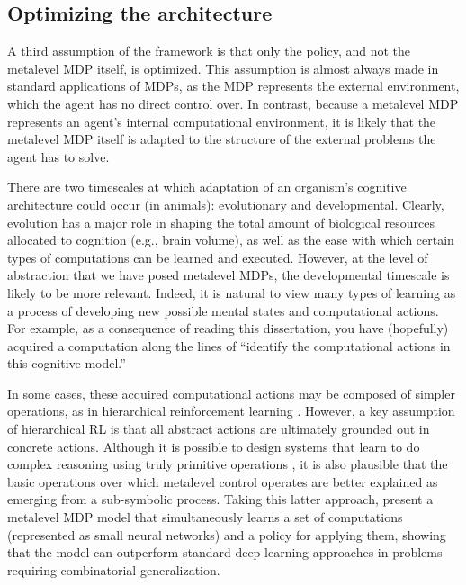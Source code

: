 \subsection{Optimizing the architecture}\label{sec:optimize-architecture}

A third assumption of the framework is that only the policy, and not the metalevel MDP itself, is optimized. This assumption is almost always made in standard applications of MDPs, as the MDP represents the external environment, which the agent has no direct control over. In contrast, because a metalevel MDP represents an agent's internal computational environment, it is likely that the metalevel MDP itself is adapted to the structure of the external problems the agent has to solve.

There are two timescales at which adaptation of an organism's cognitive architecture could occur (in animals): evolutionary and developmental. Clearly, evolution has a major role in shaping the total amount of biological resources allocated to cognition (e.g., brain volume), as well as the ease with which certain types of computations can be learned and executed. However, at the level of abstraction that we have posed metalevel MDPs, the developmental timescale is likely to be more relevant. Indeed, it is natural to view many types of learning as a process of developing new possible mental states and computational actions. For example, as a consequence of reading this dissertation, you have (hopefully) acquired a computation along the lines of ``identify the computational actions in this cognitive model.''

In some cases, these acquired computational actions may be composed of simpler operations, as in hierarchical reinforcement learning \citep{sutton1999mdps,dietterich2000hierarchical,bacon2016optioncritic}. However, a key assumption of hierarchical RL is that all abstract actions are ultimately grounded out in concrete actions. Although it is possible to design systems that learn to do complex reasoning using truly primitive operations \citep{piantadosi2021computational}, it is also plausible that the basic operations over which metalevel control operates are better explained as emerging from a sub-symbolic process. Taking this latter approach, \citet{chang2019automatically} present a metalevel MDP model that simultaneously learns a set of computations (represented as small neural networks) and a policy for applying them, showing that the model can outperform standard deep learning approaches in problems requiring combinatorial generalization.


